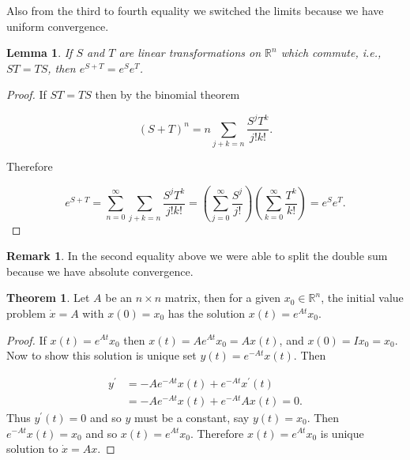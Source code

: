 \documentclass[12pt]{article}
\newtheorem*{lemma}{Lemma}
\theoremstyle{definition}
\newtheorem{theorem}{Theorem}[section]  %
\newtheorem*{remark}{Remark}
\begin{document}
Also from the third to fourth equality we switched the limits because we have uniform convergence.

\begin{lemma}
If $S$ and $T$ are linear transformations on $\mathbb{R}^n$ which commute, i.e., $ST = TS$, then $e^{S+T} = e^S e^T$.
\end{lemma}

\begin{proof}
If $ST = TS$ then by the binomial theorem

\begin{equation*}
(S + T)^n = n \sum_{j + k = n} \dfrac{S^j T^k}{j! k!}.
\end{equation*}

Therefore 

\begin{equation*}
e^{S + T} = \sum^{\infty}_{n = 0} \sum_{j + k = n} \dfrac{S^j T^k}{j!k!} = \left( \sum^{\infty}_{j = 0} \dfrac{S^j}{j!} \right)
\left( \sum^{\infty}_{k = 0} \dfrac{T^k}{k!} \right) = e^S e^T.
\end{equation*}
\end{proof}

\begin{remark}
In the second equality above we were able to split the double sum because we have absolute convergence.
\end{remark}

\begin{theorem}
Let $A$ be an $n \times n$ matrix, then for a given $x_0 \in \mathbb{R}^n$, the initial value problem $\dot x = A$ with $x(0) = x_0$ has the
solution $x(t) = e^{At}x_0$.
\end{theorem} 

\begin{proof}
If $x(t) = e^{At}x_0$ then $x(t) = Ae^{At}x_0 = Ax(t)$, and $x(0) = Ix_0 = x_0$. Now to show this solution is unique set $y(t) = e^{-At}x(t)$. Then

\begin{equation*}
\begin{split}
y^{\prime} &= -Ae^{-At}x(t) + e^{-At}x^{\prime}(t) \\
&= -Ae^{-At}x(t) + e^{-At}Ax(t) = 0.
\end{split}
\end{equation*}
 Thus $y^{\prime}(t) = 0$ and so $y$ must be a constant,
say $y(t) = x_0$. Then $e^{-At}x(t) = x_0$ and so $x(t) = e^{At}x_0$. Therefore $x(t) = e^{At}x_0$ is unique solution to $\dot x = Ax$.
\end{proof}
\end{document}
